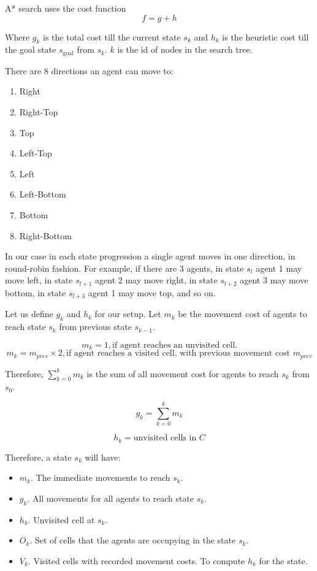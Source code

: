 A* search uses the cost function
$$ f = g + h $$

Where $g_k$ is the total cost till the current state $s_k$ and $h_k$ is the heuristic cost till the goal state $s_\text{goal}$ from $s_k$. $k$ is the id of nodes in the search tree.


There are 8 directions an agent can move to:
\begin{enumerate}
	\item Right
	\item Right-Top
	\item Top
	\item Left-Top
	\item Left
	\item Left-Bottom
	\item Bottom
	\item Right-Bottom
\end{enumerate}


In our case in each state progression a single agent moves in one direction, in round-robin fashion.  For example, if there are 3 agents, in state $s_l$ agent 1 may move left, in state $s_{l+1}$ agent 2 may move right, in state $s_{l+2}$ agent 3 may move  bottom, in state $s_{l+3}$ agent 1 may move top, and so on.

Let us define $g_k$ and $h_k$ for our setup. Let $m_k$ be the movement cost of agents to reach state $s_k$ from previous state $s_{k-1}$.

$$ m_k = 1, \text{if agent reaches an unvisited cell}. $$
$$ m_k = m_{prev} \times 2, \text{if agent reaches a visited cell, with previous movement cost } m_{prev} $$

Therefore, $\sum\limits_{k=0}^k m_k$ is the sum of all movement cost for agents to reach $s_k$ from $s_0$.

$$g_k = \sum\limits_{k=0}^k m_k $$

$$ h_k = \text{unvisited cells in } C$$


Therefore, a state $s_k$ will have:
\begin{itemize}
	\item $m_k$. The immediate movements to reach $s_k$.
	\item $g_k$. All movements for all agents to reach state $s_k$.
	\item $h_k$. Unvisited cell at $s_k$.
	\item $O_k$. Set of cells that the agents are occupying in the state $s_k$.
	\item $V_k$. Visited cells with recorded movement costs. To compute $h_k$ for the state.
\end{itemize}

